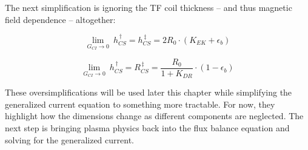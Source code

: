 The next simplification is ignoring the TF coil thickness -- and thus magnetic field dependence -- altogether:

\begin{equation}
	\underset{G_{CI} \to 0}{\lim} \ h_{CS}^{\,\dagger} = h_{CS}^{\,\ddagger} = 2 R_0 \cdot \left( K_{EK} + \epsilon_b \right) 
\end{equation}

\begin{equation}
	\underset{G_{CI} \to 0}{\lim} \ h_{CS}^{\,\dagger} = R_{CS}^{\,\ddagger} = \frac{ R_0 }{ 1 + K_{DR} } \cdot \left( 1 - \epsilon_b  \right)
\end{equation}

These oversimplifications will be used later this chapter while simplifying the generalized current equation to something more tractable. For now, they highlight how the dimensions change as different components are neglected. The next step is bringing plasma physics back into the flux balance equation and solving for the generalized current.

%
